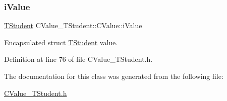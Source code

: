 \subsubsection{\texorpdfstring{i\+Value}{iValue}}
{\footnotesize\ttfamily \hyperlink{struct_c_value___t_student_1_1_t_student}{T\+Student} C\+Value\+\_\+\+T\+Student\+::\+C\+Value\+::i\+Value\hspace{0.3cm}{\ttfamily [private]}}



Encapsulated {\ttfamily struct} \hyperlink{struct_c_value___t_student_1_1_t_student}{T\+Student} value. 



Definition at line 76 of file C\+Value\+\_\+\+T\+Student.\+h.



The documentation for this class was generated from the following file\+:\begin{DoxyCompactItemize}
\item 
\hyperlink{_c_value___t_student_8h}{C\+Value\+\_\+\+T\+Student.\+h}\end{DoxyCompactItemize}
